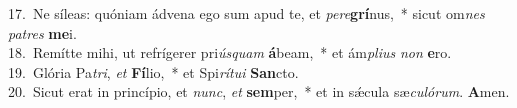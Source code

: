 {17.~}Ne síleas: quóniam ádvena ego sum apud te, et \textit{pe}\textit{re}\textbf{grí}nus,~* sicut om\textit{nes} \textit{pa}\textit{tres} \textbf{me}i.\\
{18.~}Remítte mihi, ut refrígerer pri\textit{ús}\textit{quam} \textbf{á}beam,~* et ám\textit{pli}\textit{us} \textit{non} \textbf{e}ro.\\
{19.~}Glória Pa\textit{tri}, \textit{et} \textbf{Fí}lio,~* et Spi\textit{rí}\textit{tu}\textit{i} \textbf{San}cto.\\
{20.~}Sicut erat in princípio, et \textit{nunc}, \textit{et} \textbf{sem}per,~* et in sǽcula sæ\textit{cu}\textit{ló}\textit{rum}. \textbf{A}men.\\
